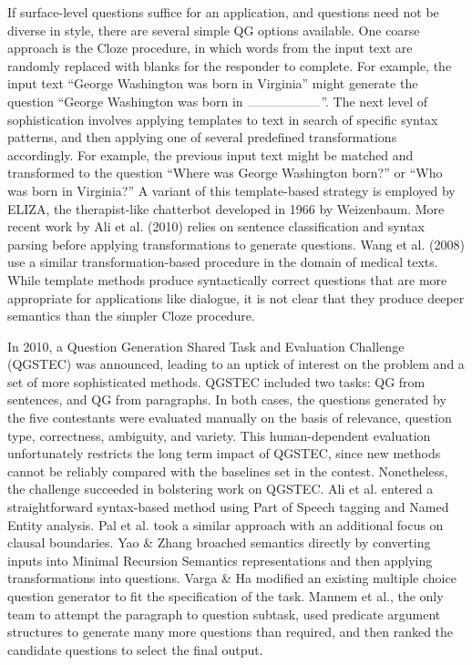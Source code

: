 If surface-level questions suffice for an application, and questions need not be diverse in style, there are several simple QG options available. One coarse approach is the Cloze procedure, in which words from the input text are randomly replaced with blanks for the responder to complete. For example, the input text ``George Washington was born in Virginia'' might generate the question ``George Washington was born in $\rule{2cm}{0.05mm}$''. The next level of sophistication involves applying templates to text in search of specific syntax patterns, and then applying one of several predefined transformations accordingly. For example, the previous input text might be matched and transformed to the question ``Where was George Washington born?'' or ``Who was born in Virginia?'' A variant of this template-based strategy is employed by ELIZA, the therapist-like chatterbot developed in 1966 by Weizenbaum. More recent work by Ali et al. (2010) relies on sentence classification and syntax parsing before applying transformations to generate questions.  Wang et al. (2008) use a similar transformation-based procedure in the domain of medical texts. While template methods produce syntactically correct questions that are more appropriate for applications like dialogue, it is not clear that they produce deeper semantics than the simpler Cloze procedure. 

In 2010, a Question Generation Shared Task and Evaluation Challenge (QGSTEC) was announced, leading to an uptick of interest on the problem and a set of more sophisticated methods. QGSTEC included two tasks: QG from sentences, and QG from paragraphs. In both cases, the questions generated by the five contestants were evaluated manually on the basis of relevance, question type, correctness, ambiguity, and variety. This human-dependent evaluation unfortunately restricts the long term impact of QGSTEC, since new methods cannot be reliably compared with the baselines set in the contest. Nonetheless, the challenge succeeded in bolstering work on QGSTEC. Ali et al. entered a straightforward syntax-based method using Part of Speech tagging and Named Entity analysis. Pal et al. took a similar approach with an additional focus on clausal boundaries. Yao \& Zhang broached semantics directly by converting inputs into Minimal Recursion Semantics representations and then applying transformations into questions. Varga \& Ha modified an existing multiple choice question generator to fit the specification of the task. Mannem et al., the only team to attempt the paragraph to question subtask, used predicate argument structures to generate many more questions than required, and then ranked the candidate questions to select the final output. 

